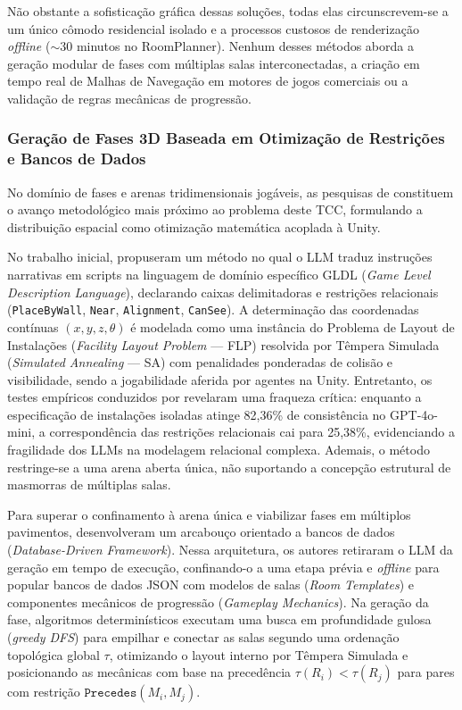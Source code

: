 Não obstante a sofisticação gráfica dessas soluções, todas elas circunscrevem-se a um único cômodo residencial isolado e a processos custosos de renderização \textit{offline} ($\sim$30 minutos no RoomPlanner). Nenhum desses métodos aborda a geração modular de fases com múltiplas salas interconectadas, a criação em tempo real de Malhas de Navegação em motores de jogos comerciais ou a validação de regras mecânicas de progressão.

\subsubsection{Geração de Fases 3D Baseada em Otimização de Restrições e Bancos de Dados}
\label{sec:relacionados_otimizacao_fases}

No domínio de fases e arenas tridimensionais jogáveis, as pesquisas de \textcite{xu2025databasedrivenframework3dlevel, xu2025constraint} constituem o avanço metodológico mais próximo ao problema deste TCC, formulando a distribuição espacial como otimização matemática acoplada à Unity.

No trabalho inicial, \textcite{xu2025constraint} propuseram um método no qual o LLM traduz instruções narrativas em scripts na linguagem de domínio específico GLDL (\textit{Game Level Description Language}), declarando caixas delimitadoras e restrições relacionais (\texttt{PlaceByWall}, \texttt{Near}, \texttt{Alignment}, \texttt{CanSee}). A determinação das coordenadas contínuas $(x, y, z, \theta)$ é modelada como uma instância do Problema de Layout de Instalações (\textit{Facility Layout Problem} --- FLP) resolvida por Têmpera Simulada (\textit{Simulated Annealing} --- SA) com penalidades ponderadas de colisão e visibilidade, sendo a jogabilidade aferida por agentes na Unity. Entretanto, os testes empíricos conduzidos por \textcite{xu2025constraint} revelaram uma fraqueza crítica: enquanto a especificação de instalações isoladas atinge 82,36\% de consistência no GPT-4o-mini, a correspondência das restrições relacionais cai para 25,38\%, evidenciando a fragilidade dos LLMs na modelagem relacional complexa. Ademais, o método restringe-se a uma arena aberta única, não suportando a concepção estrutural de masmorras de múltiplas salas.

Para superar o confinamento à arena única e viabilizar fases em múltiplos pavimentos, \textcite{xu2025databasedrivenframework3dlevel} desenvolveram um arcabouço orientado a bancos de dados (\textit{Database-Driven Framework}). Nessa arquitetura, os autores retiraram o LLM da geração em tempo de execução, confinando-o a uma etapa prévia e \textit{offline} para popular bancos de dados JSON com modelos de salas (\textit{Room Templates}) e componentes mecânicos de progressão (\textit{Gameplay Mechanics}). Na geração da fase, algoritmos determinísticos executam uma busca em profundidade gulosa (\textit{greedy DFS}) para empilhar e conectar as salas segundo uma ordenação topológica global $\tau$, otimizando o layout interno por Têmpera Simulada e posicionando as mecânicas com base na precedência $\tau(R_i) < \tau(R_j)$ para pares com restrição $\texttt{Precedes}(M_i, M_j)$.

